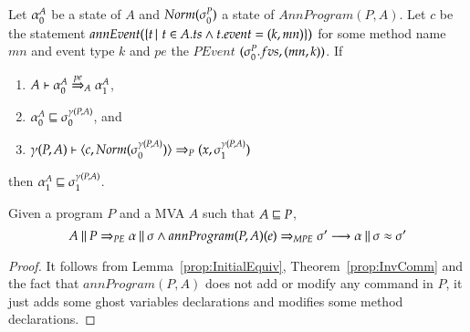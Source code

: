 \documentclass[a4paper,10pt]{article}
\begin{document}
\begin{theorem}
Let $\alpha_0^A$ be a state of $A$ and $Norm(\sigma_0^P)$ a state of $AnnProgram(P, A)$.
Let $c$ be the statement $annEvent(\{t \,|\,\, t \in A.ts \wedge t.event = (k,mn)\})$ for some method name $mn$
and event type $k$ and $pe$ the $PEvent$ $(\sigma_0^P.fvs, (mn, k))$. If
\begin{enumerate}
  \item $A \vdash \alpha_0^A \stackrel{pe}{\Rightarrow}_A \alpha_1^A$,
  \item $\alpha_0^A \sqsubseteq \sigma_0^{\gamma(P,A)}$, and
  \item $\gamma(P,A) \vdash \langle c, Norm(\sigma_0^{\gamma(P,A)}) \rangle \Rightarrow_P (x, \sigma_1^{\gamma(P,A)})$
\end{enumerate}
then $\alpha_1^A \sqsubseteq \sigma_1^{\gamma(P,A)}$.
\end{theorem}

\medskip
\begin{theorem}\label{prop:Correctness}
Given a program $P$ and a MVA $A$ such that $A \sqsubseteq P$,
\[A \mathbin{\|} P \Rightarrow_{PE} \alpha \mathbin{\|} \sigma \wedge annProgram(P, A)(e) \Rightarrow_{MPE} \sigma' 
\longrightarrow \alpha \mathbin{\|} \sigma \approx \sigma'\]
\begin{proof}
It follows from Lemma~\ref{prop:InitialEquiv}, Theorem~\ref{prop:InvComm} and the fact that $annProgram(P,
A)$ does not add or modify any command in $P$, it just adds some ghost variables declarations and modifies
some method declarations.
\end{proof}
\end{theorem}



\end{document}
